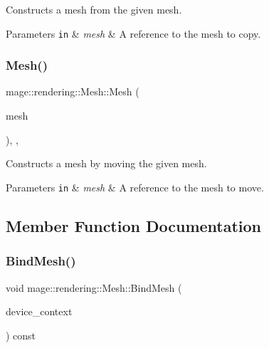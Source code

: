 Constructs a mesh from the given mesh.


\begin{DoxyParams}[1]{Parameters}
\mbox{\tt in}  & {\em mesh} & A reference to the mesh to copy. \\
\hline
\end{DoxyParams}
\hypertarget{classmage_1_1rendering_1_1_mesh_aeb090ec9531823157f010a70a9dabf45}{}\label{classmage_1_1rendering_1_1_mesh_aeb090ec9531823157f010a70a9dabf45} 
\subsubsection{\texorpdfstring{Mesh()}{Mesh()}\hspace{0.1cm}{\footnotesize\ttfamily [3/3]}}
{\footnotesize\ttfamily mage\+::rendering\+::\+Mesh\+::\+Mesh (\begin{DoxyParamCaption}\item[{\hyperlink{classmage_1_1rendering_1_1_mesh}{Mesh} \&\&}]{mesh }\end{DoxyParamCaption})\hspace{0.3cm}{\ttfamily [protected]}, {\ttfamily [default]}, {\ttfamily [noexcept]}}

Constructs a mesh by moving the given mesh.


\begin{DoxyParams}[1]{Parameters}
\mbox{\tt in}  & {\em mesh} & A reference to the mesh to move. \\
\hline
\end{DoxyParams}


\subsection{Member Function Documentation}
\hypertarget{classmage_1_1rendering_1_1_mesh_a36999cc548e68c3ad0c8d348ad0ead4f}{}\label{classmage_1_1rendering_1_1_mesh_a36999cc548e68c3ad0c8d348ad0ead4f} 
\subsubsection{\texorpdfstring{Bind\+Mesh()}{BindMesh()}\hspace{0.1cm}{\footnotesize\ttfamily [1/2]}}
{\footnotesize\ttfamily void mage\+::rendering\+::\+Mesh\+::\+Bind\+Mesh (\begin{DoxyParamCaption}\item[{I\+D3\+D11\+Device\+Context \&}]{device\+\_\+context }\end{DoxyParamCaption}) const\hspace{0.3cm}{\ttfamily [noexcept]}}

